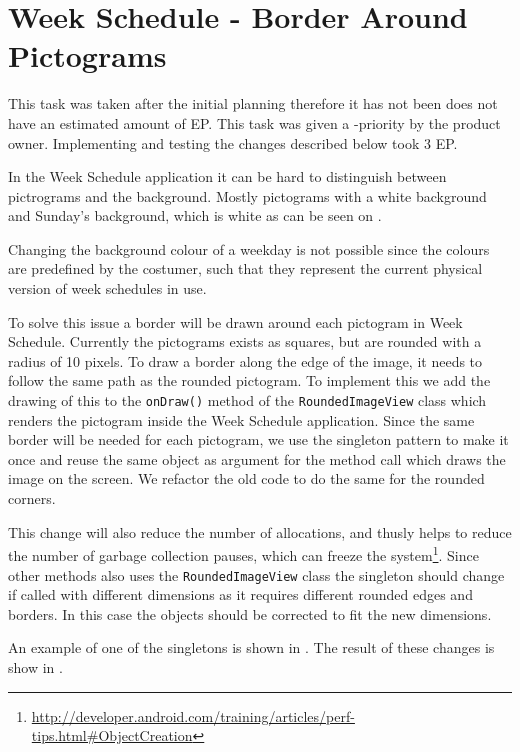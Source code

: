 \section{Week Schedule - Border Around Pictograms}
This task was taken after the initial planning therefore it has not been does not have an estimated amount of EP. 
This task was given a \phigh-priority by the product owner. 
Implementing and testing the changes described below took 3 EP. 

In the Week Schedule application it can be hard to distinguish between pictrograms and the background.
Mostly pictograms with a white background and Sunday's background, which is white as can be seen on .

Changing the background colour of a weekday is not possible since the colours are predefined by the costumer, such that they represent the current physical version of week schedules in use.

To solve this issue a border will be drawn around each pictogram in Week Schedule.
Currently the pictograms exists as squares, but are rounded with a radius of 10 pixels.
To draw a border along the edge of the image, it needs to follow the same path as the rounded pictogram. 
To implement this we add the drawing of this to the \texttt{onDraw()} method of the \texttt{RoundedImageView} class which renders the pictogram inside the Week Schedule application. 
Since the same border will be needed for each pictogram, we use the singleton pattern to make it once and reuse the same object as argument for the method call which draws the image on the screen. 
We refactor the old code to do the same for the rounded corners. 

This change will also reduce the number of allocations, and  thusly helps to reduce the number of garbage collection pauses, which can freeze the system\footnote{\url{http://developer.android.com/training/articles/perf-tips.html\#ObjectCreation}}. 
Since other methods also uses the \texttt{RoundedImageView} class the singleton should change if called with different dimensions as it requires different rounded edges and borders. 
In this case the objects should be corrected to fit the new dimensions. 

An example of one of the singletons is shown in .
The result of these changes is show in . 

